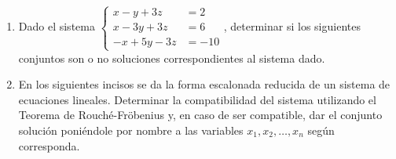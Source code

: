 \documentclass[11pt]{article}
\begin{document}
\begin{enumerate}[\hspace{-7mm} 1) ]
\begin{enumerate}[i) ]
\end{enumerate}














\item Dado el sistema $\left\{ \begin{matrix}
x - y + 3z &= 2 \\
x - 3y + 3z &= 6 \\
-x + 5y - 3z &= -10
\end{matrix} \right.$, determinar si los siguientes conjuntos son o no soluciones correspondientes al sistema dado.

\begin{enumerate}
\end{enumerate}


















\item  En los siguientes incisos se da la forma escalonada reducida de un sistema de ecuaciones lineales. Determinar la compatibilidad del sistema utilizando el Teorema de Rouché-Fröbenius y, en caso de ser compatible, dar el conjunto solución poniéndole por nombre a las variables \(x_1, x_2, \ldots, x_n\) según corresponda. 


\vspace{-8mm}
{\singlespace
\begin{enumerate}[a) ]
\end{enumerate}}
\end{enumerate}
\end{document}
